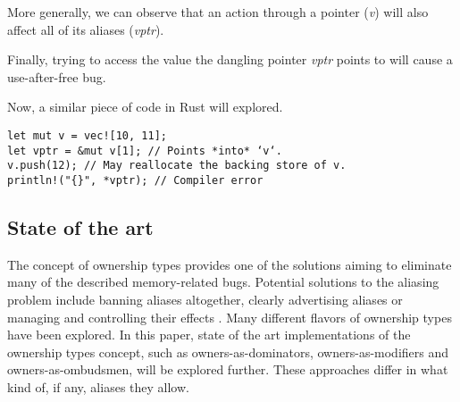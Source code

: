 \documentclass[sigplan,11pt,nonacm]{acmart}
\begin{document}
More generally, we can observe that an action through a pointer (\emph{v}) will also affect all of its aliases (\emph{vptr}).


Finally, trying to access the value the dangling pointer \emph{vptr} points to will cause a use-after-free bug.

Now, a similar piece of code in Rust will explored.

\begin{lstlisting}
let mut v = vec![10, 11];
let vptr = &mut v[1]; // Points *into* ‘v‘.
v.push(12); // May reallocate the backing store of v.
println!("{}", *vptr); // Compiler error
\end{lstlisting}





\subsection{State of the art}
\label{sec:state-of-the-art}


The concept of ownership types provides one of the solutions aiming to eliminate many of the described memory-related bugs.
Potential solutions to the aliasing problem include banning aliases altogether, clearly advertising aliases or managing and controlling their effects \cite{ownership-types-survey}.
Many different flavors of ownership types have been explored.
In this paper, state of the art implementations of the ownership types concept, such as owners-as-dominators, owners-as-modifiers and owners-as-ombudsmen, will be explored further.
These approaches differ in what kind of, if any, aliases they allow.
\end{document}
